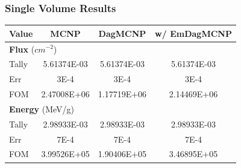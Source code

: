 \documentclass[12pt]{beamer}
\begin{document}
\begin{frame}
\frametitle{Single Volume Results}

\begin{table}[h]

  \begin{center}

    \begin{tabular}{lccc}
     \toprule
      Value & MCNP & DagMCNP & w/ EmDagMCNP \\
     \toprule
     \multicolumn{4}{l}{\textbf{Flux} ($cm^{-2}$)} \\
     \hline
     Tally & 5.61374E-03 & 5.61374E-03 & 5.61374E-03 \\
     Err & 3E-4 & 3E-4 & 3E-4  \\
     FOM & 2.47008E+06 & 1.17719E+06 & 2.14469E+06 \\
     \hline
     \multicolumn{4}{l}{\textbf{Energy} (MeV/g)} \\
     \hline
     Tally & 2.98933E-03 & 2.98933E-03 & 2.98933E-03 \\
     Err & 7E-4 & 7E-4 & 7E-4 \\
     FOM & 3.99526E+05 & 1.90406E+05 & 3.46895E+05 \\
     \bottomrule
     
    \end{tabular}


  \end{center}
\vspace{-0.4cm}
\end{table}

\end{frame}



\begin{frame}
  
  \footnotesize{}
\end{frame}
\end{document}
